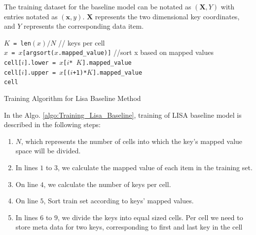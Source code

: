 The training dataset for the baseline model can be notated as $(\boldsymbol{X}, Y)$ with entries notated as $(\boldsymbol{x},y)$. $\boldsymbol{X}$ represents the two dimensional key coordinates, and $Y$ represents the corresponding data item. 

\begin{algorithm}[H]
    \SetAlgoLined
     
     \texttt{$K$ = len$(x) \slash N$} // keys per cell \\
     \texttt{$x$ = $x$[argsort($x$.mapped\_value)]} //sort x based on mapped values \\ 
     {
         \texttt{cell[$i$].lower = $x$[$i$* $K$].mapped\_value } \\
		\texttt{cell[$i$].upper = $x$[($i$+1)*$K$].mapped\_value } \\  
		
     }
     \Return \texttt{cell}
		   
     \caption{Training Algorithm for Lisa Baseline Method}
     \label{algo:Training_Lisa_Baseline}
\end{algorithm}

In the Algo. \ref{algo:Training_Lisa_Baseline},  training of LISA baseline model is described in the following steps:

\begin{enumerate}
	\item $N$, which represents the number of cells into which the key's mapped value space will be divided.
    \item In lines $1$ to $3$, we calculate the mapped value of each item in the training set.
	\item On line $4$, we calculate the number of keys per cell. 
	\item On line $5$, Sort train set according to keys' mapped values.
	 \item In lines $6$ to $9$, we divide the keys into equal sized cells. Per cell we need to store meta data for two keys, corresponding to first and last key in the cell 
\end{enumerate}




